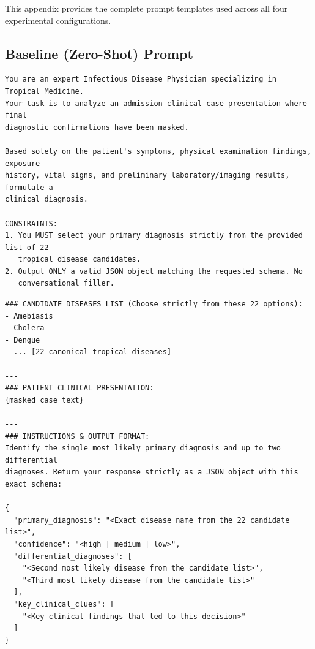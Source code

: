 \documentclass{article}
\begin{document}
This appendix provides the complete prompt templates used across all four experimental configurations.

\subsection{Baseline (Zero-Shot) Prompt}
\label{app:baseline_prompt}

\begin{promptbox}
\begin{lstlisting}[style=prompt]
You are an expert Infectious Disease Physician specializing in Tropical Medicine.
Your task is to analyze an admission clinical case presentation where final
diagnostic confirmations have been masked.

Based solely on the patient's symptoms, physical examination findings, exposure
history, vital signs, and preliminary laboratory/imaging results, formulate a
clinical diagnosis.

CONSTRAINTS:
1. You MUST select your primary diagnosis strictly from the provided list of 22
   tropical disease candidates.
2. Output ONLY a valid JSON object matching the requested schema. No
   conversational filler.
\end{lstlisting}
\end{promptbox}

\begin{promptbox}
\begin{lstlisting}[style=prompt]
### CANDIDATE DISEASES LIST (Choose strictly from these 22 options):
- Amebiasis
- Cholera
- Dengue
  ... [22 canonical tropical diseases]

---
### PATIENT CLINICAL PRESENTATION:
{masked_case_text}

---
### INSTRUCTIONS & OUTPUT FORMAT:
Identify the single most likely primary diagnosis and up to two differential
diagnoses. Return your response strictly as a JSON object with this exact schema:

{
  "primary_diagnosis": "<Exact disease name from the 22 candidate list>",
  "confidence": "<high | medium | low>",
  "differential_diagnoses": [
    "<Second most likely disease from the candidate list>",
    "<Third most likely disease from the candidate list>"
  ],
  "key_clinical_clues": [
    "<Key clinical findings that led to this decision>"
  ]
}
\end{lstlisting}
\end{promptbox}
\end{document}
